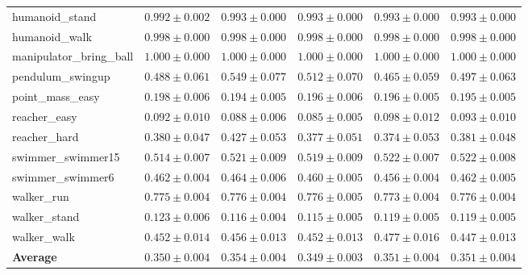 \begin{tabular}{lrrrrr}
  humanoid\_stand & $0.992\pm0.002$ & $0.993\pm0.000$ & $0.993\pm0.000$ & $0.993\pm0.000$ & $0.993\pm0.000$ \\
  humanoid\_walk & $0.998\pm0.000$ & $0.998\pm0.000$ & $0.998\pm0.000$ & $0.998\pm0.000$ & $0.998\pm0.000$ \\
  manipulator\_bring\_ball & $1.000\pm0.000$ & $1.000\pm0.000$ & $1.000\pm0.000$ & $1.000\pm0.000$ & $1.000\pm0.000$ \\
  pendulum\_swingup & $0.488\pm0.061$ & $0.549\pm0.077$ & $0.512\pm0.070$ & $0.465\pm0.059$ & $0.497\pm0.063$ \\
  point\_mass\_easy & $0.198\pm0.006$ & $0.194\pm0.005$ & $0.196\pm0.006$ & $0.196\pm0.005$ & $0.195\pm0.005$ \\
  reacher\_easy & $0.092\pm0.010$ & $0.088\pm0.006$ & $0.085\pm0.005$ & $0.098\pm0.012$ & $0.093\pm0.010$ \\
  reacher\_hard & $0.380\pm0.047$ & $0.427\pm0.053$ & $0.377\pm0.051$ & $0.374\pm0.053$ & $0.381\pm0.048$ \\
  swimmer\_swimmer15 & $0.514\pm0.007$ & $0.521\pm0.009$ & $0.519\pm0.009$ & $0.522\pm0.007$ & $0.522\pm0.008$ \\
  swimmer\_swimmer6 & $0.462\pm0.004$ & $0.464\pm0.006$ & $0.460\pm0.005$ & $\mathbf{0.456\pm0.004}$ & $0.462\pm0.005$ \\
  walker\_run & $0.775\pm0.004$ & $0.776\pm0.004$ & $0.776\pm0.005$ & $0.773\pm0.004$ & $0.776\pm0.004$ \\
  walker\_stand & $0.123\pm0.006$ & $\mathbf{0.116\pm0.004}$ & $\mathbf{0.115\pm0.005}$ & $0.119\pm0.005$ & $0.119\pm0.005$ \\
  walker\_walk & $0.452\pm0.014$ & $0.456\pm0.013$ & $0.452\pm0.013$ & $0.477\pm0.016$ & $0.447\pm0.013$ \\
  \midrule
  \textbf{Average} & $0.350\pm0.004$ & $0.354\pm0.004$ & $0.349\pm0.003$ & $0.351\pm0.004$ & $0.351\pm0.004$ \\
  \bottomrule
\end{tabular}
